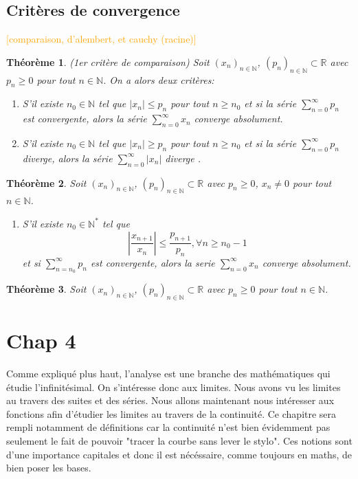 \documentclass[a4paper, 12pt, french, twoside]{article}
\newtheorem{theorem}{Théorème}[section]
\newcommand{\Nn}{{\mathbb{N}}}
\newcommand{\Rr}{{\mathbb{R}}}
\newcommand{\later}[1]{\textcolor{orange}{[#1]}}
\begin{document}
\subsection{Critères de convergence}
\later{comparaison, d'alembert, et cauchy (racine)}
\begin{theorem}
    (1er critère de comparaison)
    Soit $(x_n)_{n\in\Nn}$, $(p_n)_{n\in\Nn}\subset\Rr$ avec $p_n\geq0$ pour tout $n\in\Nn$.
    On a alors deux critères:
    \begin{enumerate}
        \item S'il existe $n_0 \in\Nn$ tel que $|x_n|\leq p_n$ pour tout $n\geq n_0$ et si la série $\sum_{n=0}^\infty p_n$ est convergente, alors la série $\sum_{n=0}^\infty x_n$ converge absolument.
       \item S'il existe $n_0 \in\Nn$ tel que $|x_n|\geq p_n$ pour tout $n\geq n_0$ et si la série $\sum_{n=0}^\infty p_n$ diverge, alors la série $\sum_{n=0}^\infty |x_n|$ diverge .
    \end{enumerate}
\end{theorem}

\begin{theorem}
    Soit $(x_n)_{n\in\Nn}$, $(p_n)_{n\in\Nn}\subset\Rr$ avec $p_n\geq0$, $x_n\neq 0$ pour tout $n\in\Nn$. 
    \begin{enumerate}
        \item S'il existe $n_0\in\Nn^*$ tel que
        \begin{equation*}
            |\frac{x_{n+1}}{x_n}|\leq \frac{p_{n+1}}{p_n}, \forall n \geq n_0-1
        \end{equation*}
        et si $\sum_{n=n_0}^\infty p_n$ est convergente, alors la serie $\sum_{n=0}^\infty x_n$ converge absolument.
    \end{enumerate}
\end{theorem}

\begin{theorem}
    Soit $(x_n)_{n\in\Nn}$, $(p_n)_{n\in\Nn}\subset\Rr$ avec $p_n\geq0$ pour tout $n\in\Nn$.
\end{theorem}
\section{Chap 4}
Comme expliqué plus haut, l'analyse est une branche des mathématiques qui étudie l'infinitésimal. On s'intéresse donc aux limites. Nous avons vu les limites au travers des suites et des séries. Nous allons maintenant nous intéresser aux fonctions afin d'étudier les limites au travers de la continuité. Ce chapitre sera rempli notamment de définitions car la continuité n'est bien évidemment pas seulement le fait de pouvoir "tracer la courbe sans lever le stylo". Ces notions sont d'une importance capitales et donc il est nécéssaire, comme toujours en maths, de bien poser les bases.
\end{document}
